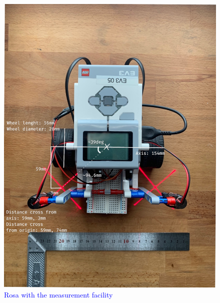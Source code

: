 {\begin{itemize}
        \begin{figure}[!ht] %
            \centering
            \includegraphics[scale=.30]{images/angle.jpg}
            \caption{\textcolor{blue}{Rosa with the measurement facility}}
            \label{fig:Method of measuring}
        \end{figure}
        

\end{itemize}}
